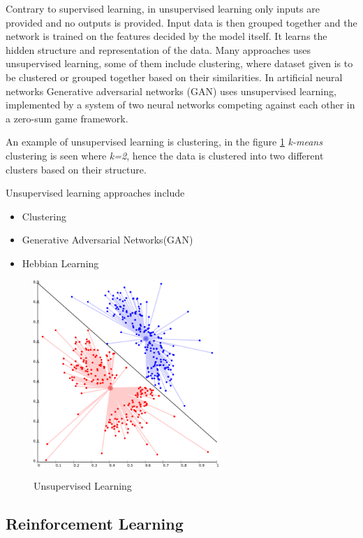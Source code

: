 \documentclass[12pt, a4paper]{report}
\begin{document}
Contrary to supervised learning, in unsupervised learning only inputs are provided and no outputs is provided. Input data is then grouped together and the network is trained on the features decided by the model itself. It learns the hidden structure and representation of the data. 
Many approaches uses unsupervised learning, some of them include clustering, where dataset given is to be clustered or grouped together based on their similarities. In artificial neural networks Generative adversarial networks (GAN) uses unsupervised learning, implemented by a system of two neural networks competing against each other in a zero-sum game framework\cite{unsupervised}.\\ \par
An example of unsupervised learning is clustering, in the figure \ref{fig:cluster} \textit{k-means} clustering is seen where \textit{k=2}, hence the data is clustered into two different clusters based on their structure.\\ \par
Unsupervised learning approaches include

\begin{itemize}
	\item{Clustering}
	\item{Generative Adversarial Networks(GAN)}
	\item{Hebbian Learning}
\end{itemize}
\par
\begin{figure}[h]
\centering	
\includegraphics[width=7cm]{cluster.png}\\
\caption{Unsupervised Learning}
\label{fig:cluster}
\end{figure} 

\subsection{Reinforcement Learning}\label{sec:ReinforcementLearning}
\end{document}
